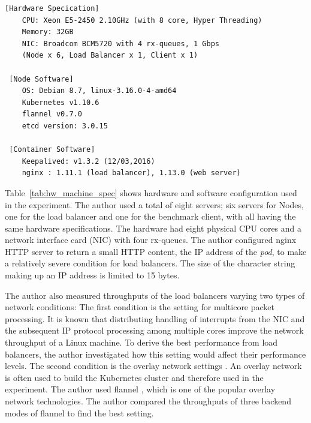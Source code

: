 \begin{table}[h]
  \centering
    \begin{minipage}{0.9\columnwidth}
      \begin{lstlisting}[frame=lines,breaklines=true,basicstyle=\small\ttfamily]
 [Hardware Specication]
    CPU: Xeon E5-2450 2.10GHz (with 8 core, Hyper Threading)
    Memory: 32GB
    NIC: Broadcom BCM5720 with 4 rx-queues, 1 Gbps
    (Node x 6, Load Balancer x 1, Client x 1)

 [Node Software]
    OS: Debian 8.7, linux-3.16.0-4-amd64
    Kubernetes v1.10.6
    flannel v0.7.0
    etcd version: 3.0.15

 [Container Software]
    Keepalived: v1.3.2 (12/03,2016)
    nginx : 1.11.1 (load balancer), 1.13.0 (web server)
      \end{lstlisting}
    \end{minipage}

  \par\bigskip
  \centering
  \begin{minipage}{0.9\columnwidth}
    \caption[Hardware and software specifications]{
      Hardware and software specifications.
      The hardware had eight physical CPU cores and a network interface card (NIC) with four rx-queues.
    }
    \label{tab:hw_machine_spec}
  \end{minipage}
\end{table}

Table~\ref{tab:hw_machine_spec} shows hardware and software configuration used in the experiment.
The author used a total of eight servers; six servers for Nodes, one for the load balancer and one for the benchmark client, with all having the same hardware specifications.
The hardware had eight physical CPU cores and a network interface card (NIC) with four rx-queues.
The author configured nginx HTTP server to return a small HTTP content, the IP address of the {\em pod}, to make a relatively severe condition for load balancers. 
The size of the character string making up an IP address is limited to 15 bytes.

The author also measured throughputs of the load balancers varying two types of network conditions:
The first condition is the setting for multicore packet processing.
It is known that distributing handling of interrupts from the NIC and the subsequent IP protocol processing among multiple cores improve the network throughput of a Linux machine.
To derive the best performance from load balancers, the author investigated how this setting would affect their performance levels.
The second condition is the overlay network settings \cite{Sill2016,Marmol2015}.
An overlay network is often used to build the Kubernetes cluster and therefore used in the experiment.
The author used flannel \cite{CoreOSFlannel}, which is one of the popular overlay network technologies. 
The author compared the throughputs of three backend modes \cite{CoreOSFlannelBackend} of flannel to find the best setting.


